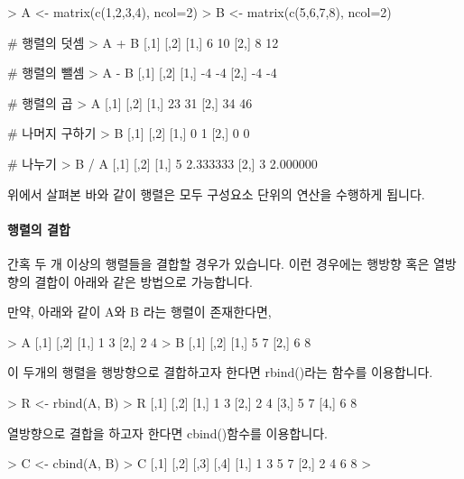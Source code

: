 \documentclass{book}
\begin{document}
\begin{Schunk}
\begin{Soutput}
> A <- matrix(c(1,2,3,4), ncol=2)
> B <- matrix(c(5,6,7,8), ncol=2)

# 행렬의 덧셈
> A + B 
     [,1] [,2]
[1,]    6   10
[2,]    8   12

# 행렬의 뺄셈
> A - B
     [,1] [,2]
[1,]   -4   -4
[2,]   -4   -4

# 행렬의 곱 
> A %
     [,1] [,2]
[1,]   23   31
[2,]   34   46

# 나머지 구하기
> B %
     [,1] [,2]
[1,]    0    1
[2,]    0    0

# 나누기 
> B / A
     [,1]     [,2]
[1,]    5 2.333333
[2,]    3 2.000000
 
\end{Soutput}
\end{Schunk}

위에서 살펴본 바와 같이 행렬은 모두 구성요소 단위의 연산을 수행하게 됩니다. 

\paragraph{행렬의 결합}  간혹 두 개 이상의 행렬들을 결합할 경우가 있습니다.
이런 경우에는 행방향 혹은 열방향의 결합이 아래와 같은 방법으로 가능합니다.

만약, 아래와 같이 A와 B 라는 행렬이 존재한다면, 

\begin{Schunk}
\begin{Soutput}
> A
     [,1] [,2]
[1,]    1    3
[2,]    2    4
> B
     [,1] [,2]
[1,]    5    7
[2,]    6    8
\end{Soutput}
\end{Schunk}

이 두개의 행렬을 행방향으로 결합하고자 한다면 rbind()라는 함수를 이용합니다.

\begin{Schunk}
\begin{Soutput}
> R <- rbind(A, B)
> R
     [,1] [,2]
[1,]    1    3
[2,]    2    4
[3,]    5    7
[4,]    6    8
\end{Soutput}
\end{Schunk}

열방향으로 결합을 하고자 한다면 cbind()함수를 이용합니다. 

\begin{Schunk}
\begin{Soutput}
> C <- cbind(A, B)
> C
     [,1] [,2] [,3] [,4]
[1,]    1    3    5    7
[2,]    2    4    6    8
> 
\end{Soutput}
\end{Schunk}
\end{document}
